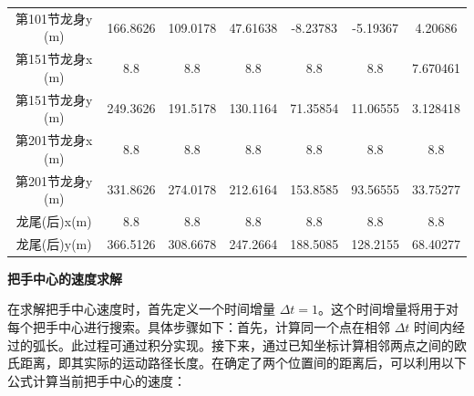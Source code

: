\documentclass[withoutpreface, bwprint]{cumcmthesis} %
\begin{document}
\begin{table}[!h]
\begin{tabular}{@{}ccccccc@{}}
        第101节龙身y (m)                       & 166.8626                         & 109.0178                          & 47.61638                           & -8.23783                           & -5.19367                           & 4.20686                            \\
        第151节龙身x (m)                       & 8.8                              & 8.8                               & 8.8                                & 8.8                                & 8.8                                & 7.670461                           \\
        第151节龙身y (m)                       & 249.3626                         & 191.5178                          & 130.1164                           & 71.35854                           & 11.06555                           & 3.128418                           \\
        第201节龙身x (m)                       & 8.8                              & 8.8                               & 8.8                                & 8.8                                & 8.8                                & 8.8                                \\
        第201节龙身y (m)                       & 331.8626                         & 274.0178                          & 212.6164                           & 153.8585                           & 93.56555                           & 33.75277                           \\
        龙尾(后)x(m)                          & 8.8                              & 8.8                               & 8.8                                & 8.8                                & 8.8                                & 8.8                                \\
        龙尾(后)y(m)                          & 366.5126                         & 308.6678                          & 247.2664                           & 188.5085                           & 128.2155                           & 68.40277                           \\ \bottomrule
    \end{tabular}
\end{table}

\textbf{把手中心的速度求解}

在求解把手中心速度时，首先定义一个时间增量 $\Delta t = 1$。这个时间增量将用于对每个把手中心进行搜索。具体步骤如下：首先，计算同一个点在相邻 $\Delta t$ 时间内经过的弧长。此过程可通过积分实现。接下来，通过已知坐标计算相邻两点之间的欧氏距离，即其实际的运动路径长度。在确定了两个位置间的距离后，可以利用以下公式计算当前把手中心的速度：
\end{document}
